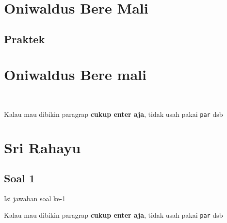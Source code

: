 \section{Oniwaldus Bere Mali}
\subsection{Praktek}
\section{Oniwaldus Bere mali}
\














Kalau mau dibikin paragrap \textbf{cukup enter aja}, tidak usah pakai \verb|par| dsb



\section{Sri Rahayu}
\subsection{Soal 1}
Isi jawaban soal ke-1

Kalau mau dibikin paragrap \textbf{cukup enter aja}, tidak usah pakai \verb|par| dsb


